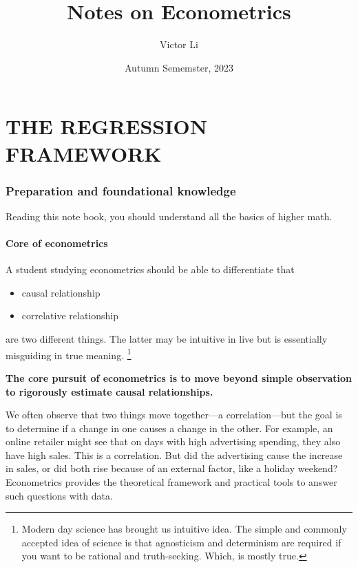 \documentclass{article}
\title{Notes on Econometrics}
\author{Victor Li}
\date{Autumn Sememster, 2023}
\providecommand{\tightlist}{
  \setlength{\itemsep}{0pt}
  \setlength{\parskip}{0pt}}
\begin{document}
\maketitle

\newpage
\tableofcontents


\newpage
\part{THE REGRESSION FRAMEWORK} %
\label{prt:the_ _regression_ _framework}


\section{Preparation and foundational knowledge}

Reading this note book, you should understand all the basics of higher math. 

\subsection{Core of econometrics} %
\label{sub:core_of_econometrics}

A student studying econometrics should be able to differentiate that
\begin{itemize}
\tightlist
  \item causal relationship
  \item correlative relationship
\end{itemize}
are two different things. The latter may be intuitive in live but is essentially misguiding in true meaning.
\footnote{Modern day science has brought us intuitive idea. The simple and commonly accepted idea of science is that agnosticism and determinism are required if you want to be rational and truth-seeking. Which, is mostly true.}

\textbf{The core pursuit of econometrics is to move beyond simple observation to rigorously estimate causal relationships.} 

We often observe that two things move together—a correlation—but the goal is to determine if a change in one causes a change in the other. For example, an online retailer might see that on days with high advertising spending, they also have high sales. This is a correlation. But did the advertising cause the increase in sales, or did both rise because of an external factor, like a holiday weekend? Econometrics provides the theoretical framework and practical tools to answer such questions with data.
\end{document}
